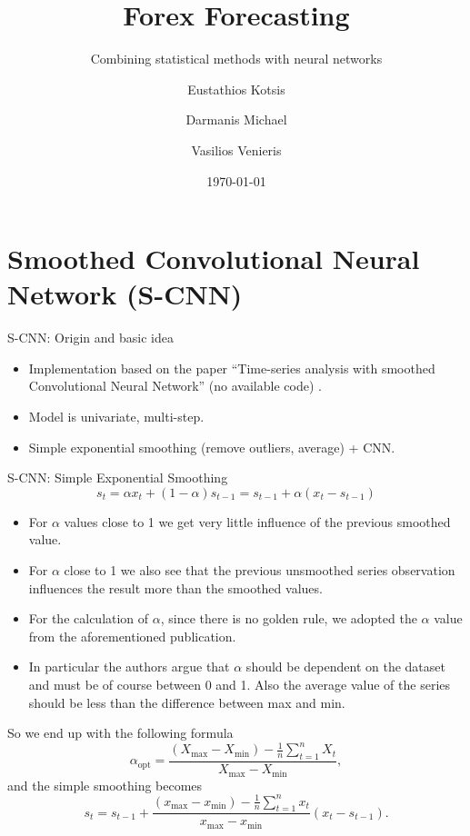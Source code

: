 \documentclass[aspectratio=169, 12pt]{beamer}
\title{Forex Forecasting}
\subtitle{Combining statistical methods with neural networks}
\author{Eustathios Kotsis \inst{1} \and Darmanis Michael \inst{1} \and Vasilios Venieris \inst{1}}
\institute{\inst{1} National and Kapodistrian University of Athens}
\date{\today}
\begin{document}
\maketitle

\section{Smoothed Convolutional Neural Network (S-CNN)}

\begin{frame}{S-CNN: Origin and basic idea}
    \begin{itemize}
        \item Implementation based on the paper ``Time-series analysis with smoothed Convolutional Neural Network''\cite{e-cnn} (no available code) .
        \item Model is univariate, multi-step.
        \item Simple exponential smoothing (remove outliers, average) + CNN.
    \end{itemize}
\end{frame}

\begin{frame}[allowframebreaks]{S-CNN: Simple Exponential Smoothing}
  \begin{equation*}
    \displaystyle s_{t}=\alpha x_{t}+(1-\alpha )s_{t-1}=s_{t-1}+\alpha (x_{t}-s_{t-1})
  \end{equation*}
    \begin{itemize}
        \item For $\alpha$ values close to 1 we get very little influence of the previous smoothed value.
        \item For $\alpha$ close to 1 we also see that the previous unsmoothed series observation influences the result more than the smoothed values.
        \item For the calculation of $\alpha$, since there is no golden rule, we adopted the $\alpha$ value from the aforementioned publication.
        \item In particular the authors argue that $\alpha$ should be dependent on the dataset and must be of course between 0 and 1. Also the average value of the series should be less than the difference between max and min.
    \end{itemize}
So we end up with the following formula
\begin{equation*}
\alpha_{\text{opt}} = \frac{\left( X_{\text{max}} - X_{\text{min}} \right) - \frac{1}{n} \sum_{t=1}^{n} X_t}{X_{\text{max}} - X_{\text{min}}},
\end{equation*}
and the simple smoothing becomes
\begin{equation*}
s_t = s_{t-1} + \frac{\left( x_{\text{max}} - x_{\text{min}} \right) - \frac{1}{n} \sum_{t=1}^{n} x_t}{x_{\text{max}} - x_{\text{min}}} \left( x_t - s_{t-1} \right) .
\end{equation*}
\end{frame}
\end{document}
